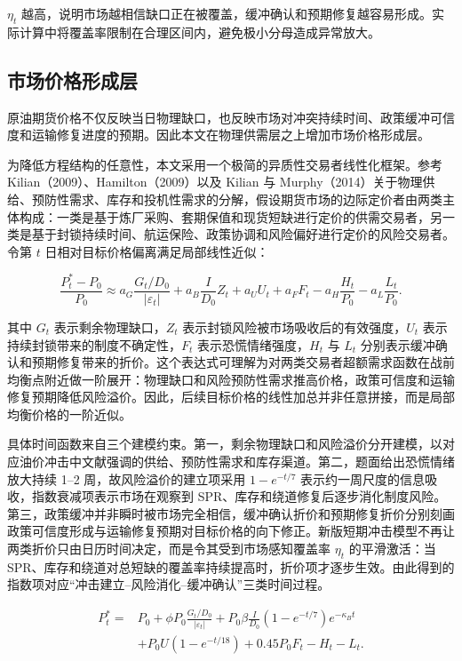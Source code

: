 $\eta_t$ 越高，说明市场越相信缺口正在被覆盖，缓冲确认和预期修复越容易形成。实际计算中将覆盖率限制在合理区间内，避免极小分母造成异常放大。

\subsection{市场价格形成层}

原油期货价格不仅反映当日物理缺口，也反映市场对冲突持续时间、政策缓冲可信度和运输修复进度的预期。因此本文在物理供需层之上增加市场价格形成层。

为降低方程结构的任意性，本文采用一个极简的异质性交易者线性化框架。参考 Kilian（2009）、Hamilton（2009）以及 Kilian 与 Murphy（2014）关于物理供给、预防性需求、库存和投机性需求的分解，假设期货市场的边际定价者由两类主体构成：一类是基于炼厂采购、套期保值和现货短缺进行定价的供需交易者，另一类是基于封锁持续时间、航运保险、政策协调和风险偏好进行定价的风险交易者。令第 \(t\) 日相对目标价格偏离满足局部线性近似：

\begin{equation}
  \frac{P_t^\ast-P_0}{P_0}
  \approx
  a_G\frac{G_t/D_0}{|\varepsilon_t|}
  +a_B\frac{I}{D_0}Z_t
  +a_U U_t
  +a_F F_t
  -a_H\frac{H_t}{P_0}
  -a_L\frac{L_t}{P_0}.
\end{equation}

其中 \(G_t\) 表示剩余物理缺口，\(Z_t\) 表示封锁风险被市场吸收后的有效强度，\(U_t\) 表示持续封锁带来的制度不确定性，\(F_t\) 表示恐慌情绪强度，\(H_t\) 与 \(L_t\) 分别表示缓冲确认和预期修复带来的折价。这个表达式可理解为对两类交易者超额需求函数在战前均衡点附近做一阶展开：物理缺口和风险预防性需求推高价格，政策可信度和运输修复预期降低风险溢价。因此，后续目标价格的线性加总并非任意拼接，而是局部均衡价格的一阶近似。

具体时间函数来自三个建模约束。第一，剩余物理缺口和风险溢价分开建模，以对应油价冲击中文献强调的供给、预防性需求和库存渠道。第二，题面给出恐慌情绪放大持续 1--2 周，故风险溢价的建立项采用 \(1-e^{-t/7}\) 表示约一周尺度的信息吸收，指数衰减项表示市场在观察到 SPR、库存和绕道修复后逐步消化制度风险。第三，政策缓冲并非瞬时被市场完全相信，缓冲确认折价和预期修复折价分别刻画政策可信度形成与运输修复预期对目标价格的向下修正。新版短期冲击模型不再让两类折价只由日历时间决定，而是令其受到市场感知覆盖率 \(\eta_t\) 的平滑激活：当 SPR、库存和绕道对总短缺的覆盖率持续提高时，折价项才逐步生效。由此得到的指数项对应“冲击建立--风险消化--缓冲确认”三类时间过程。

\begin{equation}
\begin{aligned}
  P_t^\ast
  ={}& P_0
  + \phi P_0 \frac{G_t/D_0}{|\varepsilon_t|}
  + P_0\beta\frac{I}{D_0}
    \left(1-e^{-t/7}\right)e^{-\kappa_B t} \\
  & + P_0U\left(1-e^{-t/18}\right)
  + 0.45P_0F_t
  - H_t - L_t .
\end{aligned}
\end{equation}

